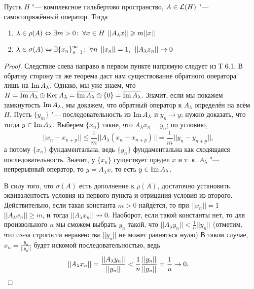 \documentclass[main]{subfiles}
\begin{document}
\begin{theorem}%
  Пусть \( H \) "--- комплексное гильбертово пространство,
  \( A \in \Linears{H} \) "--- самосопряжённый оператор.
  Тогда
  \begin{enumerate}
    \item \( \lambda \in \rho(A) \Leftrightarrow
      \exists m > 0 \colon \: \forall {x \in H} \; \, ||A_\lambda x|| \geqslant m ||x|| \)
    \item \( \lambda \in \sigma(A) \Leftrightarrow
      \exists  {\{ x_n \}}_{n=1}^\infty  \colon \:
      \forall {n} \; \, ||x_n|| = 1, \: \:
      ||A_\lambda x_n|| \to 0 \)
  \end{enumerate}
\end{theorem}
\begin{proof}
  Следствие слева направо в первом пункте напрямую следует из
  Т 6.1. %
  В обратну сторону та же теорема даст нам существование
  обратного оператора лишь на \( \operatorname{Im} A_\lambda \).
  Однако, мы уже знаем, что
  \( H = \overline{\operatorname{Im} A_\lambda} \oplus \operatorname{Ker} A_\lambda =
  \overline{\operatorname{Im} A_\lambda} \oplus \{ 0 \} = \overline{\operatorname{Im} A_\lambda} \).
  Значит, если мы покажем замкнутость \( \operatorname{Im} A_\lambda \),
  мы докажем, что обратный оператор к \( A_\lambda \)
  определён на всём \( H \).
  Пусть \( \{ y_m \} \) "--- последовательность из
  \( \operatorname{Im} A_\lambda \) и \( y_n \to y \);
  нужно доказать, что тогда \( y \in \operatorname{Im} A_\lambda \).
  Выберем \( \{ x_n \} \) такие, что \( A_\lambda x_n = y_n \);
  по условию,
  \[ ||x_n - x_{n+p}|| \le
    \frac1m ||A_\lambda (x_n - x_{n+p})||
    = \frac1m ||y_n - y_{n+p}||, \]
  а потому \( \{ x_n \} \) фундаментальна,
  ведь \( \{ y_n \} \) фундаментальна как сходящаяся последовательность.
  Значит, у \( \{ x_n \} \) существует предел \( x \)
  и т. к. \( A_\lambda \) "--- непрерывный оператор, то
  \( y = A_\lambda x \), то есть \( y \in \operatorname{Im} A_\lambda \).

  В силу того, что \( \sigma(A) \) есть дополнение к
  \( \rho(A) \), достаточно установить эквивалентость
  условия из первого пункта и отрицания условия из второго.
  Действительно, если такая константа \( m > 0\) найдётся,
  то при \( ||x_n|| = 1 \) \( ||A_\lambda x_n|| \ge m \),
  и тогда \( ||A_\lambda x_n|| \not \to 0 \).
  Наоборот, если такой константы нет,
  то для произвольного \( n \) мы сможем выбрать
  \( y_n \) такой, что \( ||A_\lambda y_n|| < \frac1n ||y_n|| \)
  (отметим, что из-за строгости неравенства
  \( ||y_n|| \) не может равняться нулю)
  В таком случае, \( x_n = \frac{y_n}{||y_n||} \)
  будет искомой последовательностью, ведь
  \[
    ||A_\lambda x_n|| = \frac{||A_\lambda y_n||}{||y_n||}
    < \frac1n \frac{||y_n||}{||y_n||} = \frac1n \to 0.
    \qedhere
  \]
\end{proof}
\end{document}

